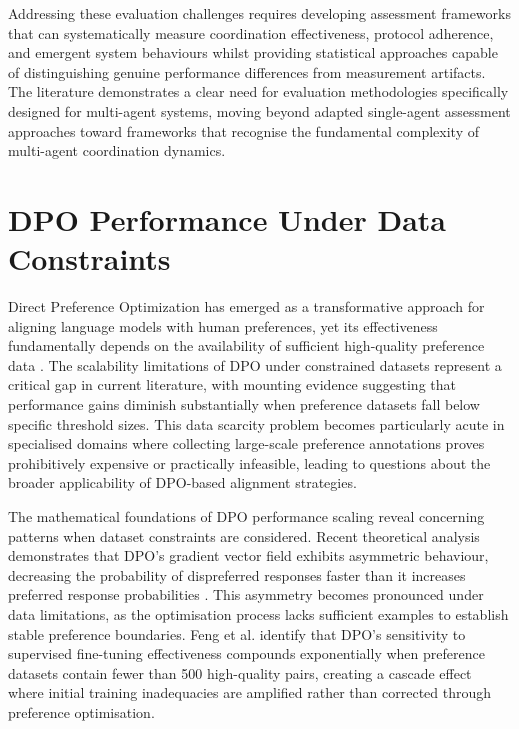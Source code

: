 Addressing these evaluation challenges requires developing assessment frameworks that can systematically measure coordination effectiveness, protocol adherence, and emergent system behaviours whilst providing statistical approaches capable of distinguishing genuine performance differences from measurement artifacts. The literature demonstrates a clear need for evaluation methodologies specifically designed for multi-agent systems, moving beyond adapted single-agent assessment approaches toward frameworks that recognise the fundamental complexity of multi-agent coordination dynamics.

\section{DPO Performance Under Data Constraints}

Direct Preference Optimization has emerged as a transformative approach for aligning language models with human preferences, yet its effectiveness fundamentally depends on the availability of sufficient high-quality preference data \cite{rafailov2023dpo}. The scalability limitations of DPO under constrained datasets represent a critical gap in current literature, with mounting evidence suggesting that performance gains diminish substantially when preference datasets fall below specific threshold sizes. This data scarcity problem becomes particularly acute in specialised domains where collecting large-scale preference annotations proves prohibitively expensive or practically infeasible, leading to questions about the broader applicability of DPO-based alignment strategies.

The mathematical foundations of DPO performance scaling reveal concerning patterns when dataset constraints are considered. Recent theoretical analysis demonstrates that DPO's gradient vector field exhibits asymmetric behaviour, decreasing the probability of dispreferred responses faster than it increases preferred response probabilities \cite{feng2024dpo_limitations}. This asymmetry becomes pronounced under data limitations, as the optimisation process lacks sufficient examples to establish stable preference boundaries. Feng et al. identify that DPO's sensitivity to supervised fine-tuning effectiveness compounds exponentially when preference datasets contain fewer than 500 high-quality pairs, creating a cascade effect where initial training inadequacies are amplified rather than corrected through preference optimisation.

